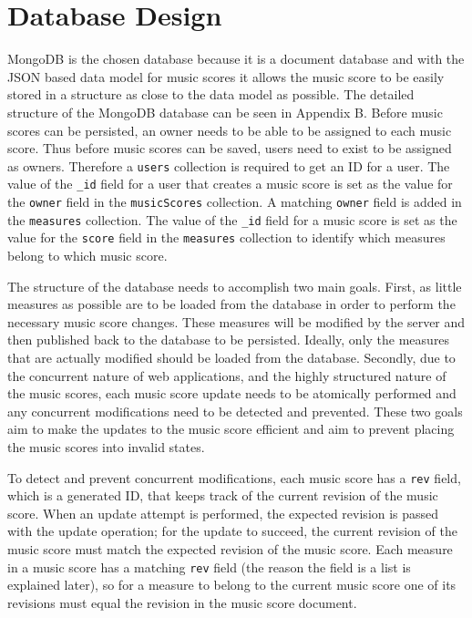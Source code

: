 \documentclass[letterpaper,12pt]{article}
\begin{document}
\section{Database Design}

MongoDB is the chosen database because it is a document database and with the JSON based data model for music scores it
allows the music score to be easily stored in a structure as close to the data model as possible. The detailed structure
of the MongoDB database can be seen in Appendix B. Before music scores can be persisted, an owner needs to be able to be
assigned to each music score. Thus before music scores can be saved, users need to exist to be assigned as owners.
Therefore a \lstinline{users} collection is required to get an ID for a user. The value of the \lstinline{_id} field for
a user that creates a music score is set as the value for the \lstinline{owner} field in the \lstinline{musicScores}
collection. A matching \lstinline{owner} field is added in the \lstinline{measures} collection. The value of the
\lstinline{_id} field for a music score is set as the value for the \lstinline{score} field in the \lstinline{measures}
collection to identify which measures belong to which music score.

The structure of the database needs to accomplish two main goals. First, as little measures as possible are to be loaded
from the database in order to perform the necessary music score changes. These measures will be modified by the server
and then published back to the database to be persisted. Ideally, only the measures that are actually modified should be
loaded from the database. Secondly, due to the concurrent nature of web applications, and the highly structured
nature of the music scores, each music score update needs to be atomically performed and any concurrent modifications
need to be detected and prevented. These two goals aim to make the updates to the music score efficient and aim to
prevent placing the music scores into invalid states.

To detect and prevent concurrent modifications, each music score has a \lstinline{rev} field, which is a generated ID,
that keeps track of the current revision of the music score. When an update attempt is performed, the expected revision
is passed with the update operation; for the update to succeed, the current revision of the music score must match the
expected revision of the music score. Each measure in a music score has a matching \lstinline{rev} field (the reason the
field is a list is explained later), so for a measure to belong to the current music score one of its revisions
must equal the revision in the music score document.
\end{document}
